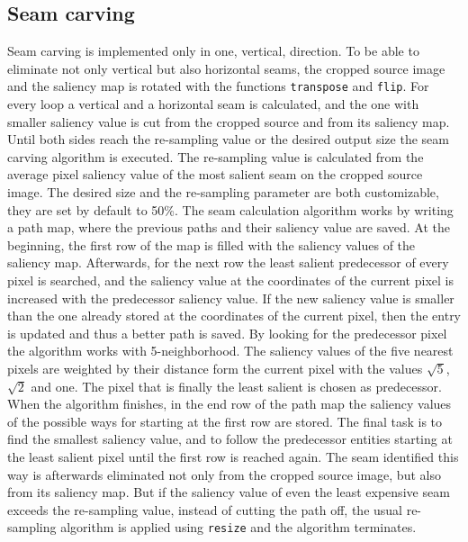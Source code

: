 \documentclass[draft,final]{vutinfth} %
\begin{document}
	\subsection{Seam carving}
	Seam carving is implemented only in one, vertical, direction. 
	To be able to eliminate not only vertical but also horizontal seams, the cropped source image and the saliency map is rotated with the functions \texttt{transpose} and \texttt{flip}.
	For every loop a vertical and a horizontal seam is calculated, and the one with smaller saliency value is cut from the cropped source and from its saliency map.
	Until both sides reach the re-sampling value or the desired output size the seam carving algorithm is executed.
	The re-sampling value is calculated from the average pixel saliency value of the most salient seam on the cropped source image.
	The desired size and the re-sampling parameter are both customizable, they are set by default to 50\%. 
	The seam calculation algorithm works by writing a path map, where the previous paths and their saliency value are saved.
	At the beginning, the first row of the map is filled with the saliency values of the saliency map.
	Afterwards, for the next row the least salient predecessor of every pixel is searched, and the saliency value at the coordinates of the current pixel is increased with the predecessor saliency value.
	If the new saliency value is smaller than the one already stored at the coordinates of the current pixel, then the entry is updated and thus a better path is saved.
	By looking for the predecessor pixel the algorithm works with 5-neighborhood. 
	The saliency values of the five nearest pixels are weighted  by their distance form the current pixel with the values $\sqrt{5}$, $\sqrt{2}$ and one.
	The pixel that is finally the least salient is chosen as predecessor.
	When the algorithm finishes, in the end row of the path map the saliency values of the possible ways for starting at the first row are stored.
	The final task is to find the smallest saliency value, and to follow the predecessor entities starting at the least salient pixel until the first row is reached again.
	The seam identified this way is afterwards eliminated not only from the cropped source image, but also from its saliency map.
	But if the saliency value of even the least expensive seam exceeds the re-sampling value, instead of cutting the path off, the usual re-sampling algorithm is applied using \texttt{resize} and the algorithm terminates.  
	
\end{document}
